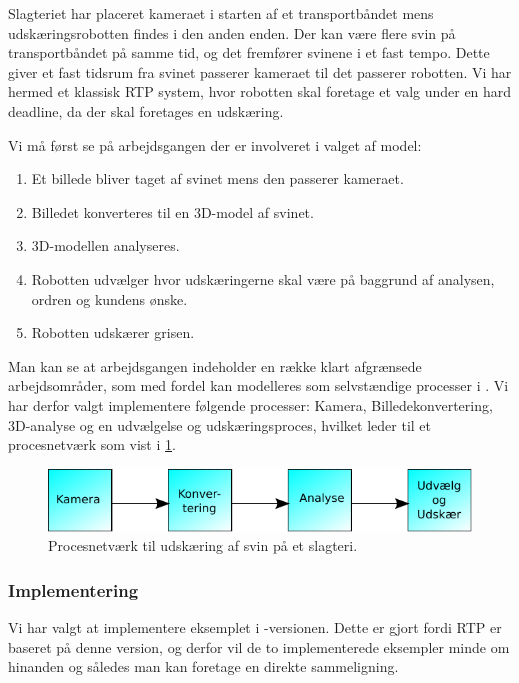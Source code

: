 Slagteriet har placeret kameraet i starten af et transportbåndet mens udskæringsrobotten findes i den anden enden. Der kan være flere svin på transportbåndet på samme tid, og det fremfører svinene i et fast tempo. Dette giver et fast tidsrum fra svinet passerer kameraet til det passerer robotten. Vi har hermed et klassisk RTP system, hvor robotten skal foretage et valg under en hard deadline, da der skal foretages en udskæring.

Vi må først se på arbejdsgangen der er involveret i valget af model:
\begin{enumerate}
\tightlist
	\item Et billede bliver taget af svinet mens den passerer kameraet.
	\item Billedet konverteres til en 3D-model af svinet.
	\item 3D-modellen analyseres.
	\item Robotten udvælger hvor udskæringerne skal være på baggrund af analysen, ordren og kundens ønske.
	\item Robotten udskærer grisen.
\end{enumerate}

Man kan se at arbejdsgangen indeholder en  række klart afgrænsede arbejdsområder, som med fordel kan modelleres som selvstændige processer i \pycsp.  Vi har derfor valgt implementere følgende processer: Kamera, Billedekonvertering, 3D-analyse og en udvælgelse og udskæringsproces, hvilket leder til et procesnetværk som vist i \cref{fig:pig-network}.

\begin{figure}
 \begin{center}
  \includegraphics[scale=1]{images/pig-network}
	\caption{Procesnetværk til udskæring af svin på et slagteri.}
	\label{fig:pig-network}
\end{center}
\end{figure}

\subsubsection*{Implementering}
Vi har valgt at implementere eksemplet i -versionen. Dette er gjort fordi RTP er baseret på denne version, og derfor vil de to implementerede eksempler  minde om hinanden og således man kan foretage en direkte sammeligning. 

